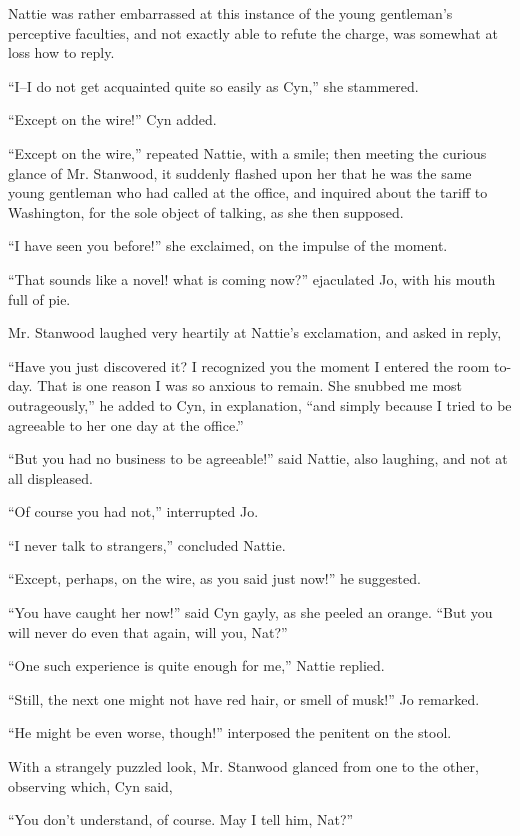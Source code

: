 Nattie was rather embarrassed at this instance of the young gentleman's
perceptive faculties, and not exactly able to refute the charge, was
somewhat at loss how to reply.

``I--I do not get acquainted quite so easily as Cyn,'' she stammered.

``Except on the wire!'' Cyn added.

``Except on the wire,'' repeated Nattie, with a smile; then meeting the
curious glance of Mr. Stanwood, it suddenly flashed upon her that he was
the same young gentleman who had called at the office, and inquired
about the tariff to Washington, for the sole object of talking, as she
then supposed.

``I have seen you before!'' she exclaimed, on the impulse of the moment.

``That sounds like a novel! what is coming now?'' ejaculated Jo, with his
mouth full of pie.

Mr. Stanwood laughed very heartily at Nattie's exclamation, and asked in
reply,

``Have you just discovered it? I recognized you the moment I entered the
room to-day. That is one reason I was so anxious to remain. She snubbed
me most outrageously,'' he added to Cyn, in explanation, ``and simply
because I tried to be agreeable to her one day at the office.''

``But you had no business to be agreeable!'' said Nattie, also laughing,
and not at all displeased.

``Of course you had not,'' interrupted Jo.

``I never talk to strangers,'' concluded Nattie.

``Except, perhaps, on the wire, as you said just now!'' he suggested.

``You have caught her now!'' said Cyn gayly, as she peeled an orange. ``But
you will never do even that again, will you, Nat?''

``One such experience is quite enough for me,'' Nattie replied.

``Still, the next one might not have red hair, or smell of musk!'' Jo
remarked.

``He might be even worse, though!'' interposed the penitent on the stool.

With a strangely puzzled look, Mr. Stanwood glanced from one to the
other, observing which, Cyn said,

``You don't understand, of course. May I tell him, Nat?''

